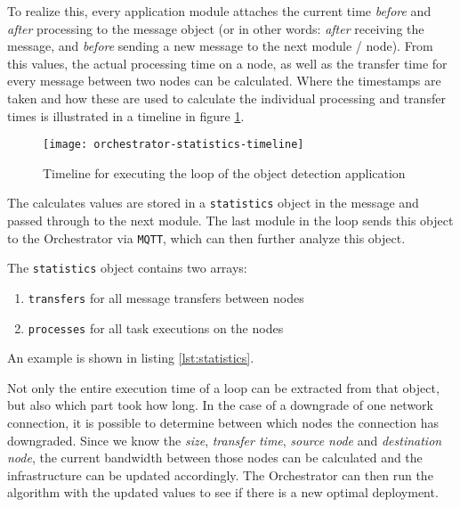 To realize this, every application module attaches the current time \textit{before} and \textit{after} processing to the message object (or in other words: \textit{after} receiving the message, and \textit{before} sending a new message to the next module / node). From this values, the actual processing time on a node, as well as the transfer time for every message between two nodes can be calculated. Where the timestamps are taken and how these are used to calculate the individual processing and transfer times is illustrated in a timeline in figure \ref{fig:orchestrator-statistics-timeline}.

\begin{figure}[h]
    \centering
    \texttt{[image: orchestrator-statistics-timeline]}
    \caption{Timeline for executing the loop of the object detection application}
    \label{fig:orchestrator-statistics-timeline}
\end{figure}

The calculates values are stored in a \texttt{statistics} object in the message and passed through to the next module. The last module in the loop sends this object to the Orchestrator via \texttt{MQTT}, which can then further analyze this object.

The \texttt{statistics} object contains two arrays:
\begin{enumerate}
    \item \texttt{transfers} for all message transfers between nodes
    \item \texttt{processes} for all task executions on the nodes
\end{enumerate}

An example is shown in listing \ref{lst:statistics}.



Not only the entire execution time of a loop can be extracted from that object, but also which part took how long. In the case of a downgrade of one network connection, it is possible to determine between which nodes the connection has downgraded. Since we know the \textit{size}, \textit{transfer time}, \textit{source node} and \textit{destination node}, the current bandwidth between those nodes can be calculated and the infrastructure can be updated accordingly. The Orchestrator can then run the algorithm with the updated values to see if there is a new optimal deployment.